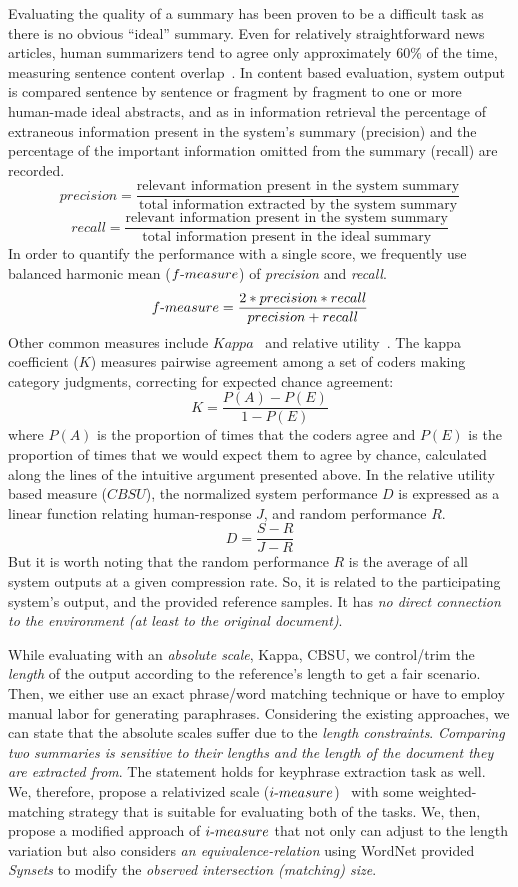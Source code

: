 \documentclass[a4paper]{report}
\begin{document}
\par Evaluating the quality of a summary has been proven to be a difficult task as there is no obvious ``ideal'' summary. Even for relatively straightforward news articles, human summarizers tend to agree only approximately $60\%$ of the time, measuring sentence content overlap~\cite{Radev2002}. In content based evaluation, system output is compared sentence by sentence or fragment by fragment to one or more human-made ideal abstracts, and as in information retrieval the percentage of extraneous information present in the system's summary (precision) and the percentage of the important information omitted from the summary (recall) are recorded.
\[precision = \frac{\text{relevant information present in the system summary}}{\text{total information extracted by the system summary}}\]
\[recall = \frac{\text{relevant information present in the system summary}}{\text{total information present in the ideal summary}}\] 
In order to quantify the performance with a single score, we frequently use balanced harmonic mean ($f\hbox{-}measure$) of \emph{precision} and \emph{recall}.
\[f\hbox{-} measure = \frac{2 * precision * recall}{precision + recall}\]
Other common measures include $Kappa$~\cite{Carletta:1996:AAC:230386.230390} and relative utility~\cite{Radev:2000:CSM:1117575.1117578}. The kappa coefficient ($K$) measures pairwise agreement among a set of coders making category judgments, correcting for expected chance agreement: 
\[ K = \frac{P(A) - P(E)}{1- P(E)}\]
where $P(A)$ is the proportion of times that the coders agree and $P(E)$ is the proportion of times that we would expect them to agree by chance, calculated along the lines of the intuitive argument presented above. In the relative utility based measure ($CBSU$), the normalized system performance $D$ is expressed as a linear function relating human-response $J$, and random performance $R$.
\[D = \frac{S - R}{J - R}\]
But it is worth noting that the random performance $R$ is the average of all system outputs at a given compression rate. So, it is related to the participating system's output, and the provided reference samples. It has \emph{no direct connection to the environment (at least to the original document)}.\\
\par While evaluating with an \emph{absolute scale}, Kappa, CBSU, we control/trim the \emph{length} of the output according to the reference's length to get a fair scenario. Then, we either use an exact phrase/word matching technique or have to employ manual labor for generating paraphrases. Considering the existing approaches, we can state that the absolute scales suffer due to the \emph{length constraints}. \emph{Comparing two summaries is sensitive to their lengths and the length of the document they are extracted from}. The statement holds for keyphrase extraction task as well. We, therefore, propose a relativized scale ($i\hbox{-}measure$)~\cite{DBLP:conf/ecir/HamidHT16} with some weighted-matching strategy that is suitable for evaluating both of the tasks. We, then, propose a modified approach of $i\hbox{-}measure$ that not only can adjust to the length variation but also considers \emph{an equivalence-relation} using WordNet provided \emph{Synsets} to modify the \emph{observed intersection (matching) size}.
\end{document}
